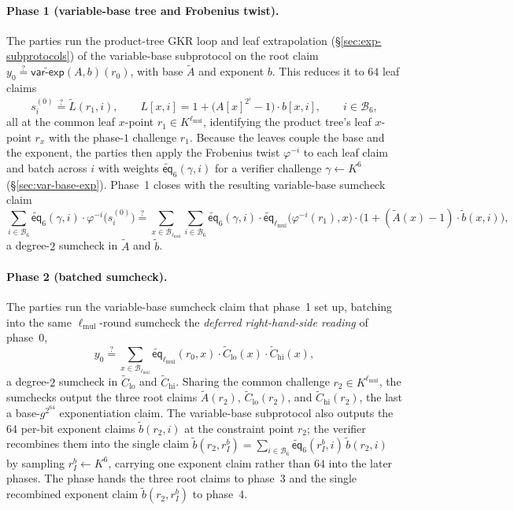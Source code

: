 \documentclass{article}
\theoremstyle{definition}
\newcommand*{\mle}{\widetilde}
\newcommand{\eq}{\mathsf{eq}}
\newcommand{\BB}{\mathcal{B}}
\begin{document}
\paragraph{Phase 1 (variable-base tree and Frobenius twist).}
The parties run the product-tree GKR loop and leaf extrapolation (\S\ref{sec:exp-subprotocols}) of the variable-base subprotocol on the root claim $y_0 \stackrel{?}{=} \mle{\textsf{var-exp}}(A, b)(r_0)$, with base $\mle{A}$ and exponent $b$. This reduces it to $64$ leaf claims
\[
  s^{(0)}_i \stackrel{?}{=} \mle{L}(r_1, i), \qquad L[x, i] = 1 + \bigl( A[x]^{2^i} - 1 \bigr) \cdot b[x, i], \qquad i \in \BB_6,
\]
all at the common leaf $x$-point $r_1 \in K^{\ell_\text{mul}}$, identifying the product tree's leaf $x$-point $r_x$ with the phase-$1$ challenge $r_1$. Because the leaves couple the base and the exponent, the parties then apply the Frobenius twist $\varphi^{-i}$ to each leaf claim and batch across $i$ with weights $\mle{\eq}_6(\gamma, i)$ for a verifier challenge $\gamma \gets K^6$ (\S\ref{sec:var-base-exp}). Phase~1 closes with the resulting variable-base sumcheck claim
\[
  \sum_{i \in \BB_6} \mle{\eq}_6(\gamma, i) \cdot \varphi^{-i}\bigl( s^{(0)}_i \bigr) \stackrel{?}{=} \sum_{x \in \BB_{\ell_\text{mul}}} \sum_{i \in \BB_6} \mle{\eq}_6(\gamma, i) \cdot \mle{\eq}_{\ell_\text{mul}}\bigl( \varphi^{-i}(r_1), x \bigr) \cdot \bigl( 1 + (\mle{A}(x) - 1) \cdot \mle{b}(x, i) \bigr),
\]
a degree-$2$ sumcheck in $\mle{A}$ and $\mle{b}$.

\paragraph{Phase 2 (batched sumcheck).}
The parties run the variable-base sumcheck claim that phase~1 set up, batching into the same $\ell_\text{mul}$-round sumcheck the \emph{deferred right-hand-side reading} of phase~0,
\[
  y_0 \stackrel{?}{=} \sum_{x \in \BB_{\ell_\text{mul}}} \mle{\eq}_{\ell_\text{mul}}(r_0, x) \cdot \mle{C}_\text{lo}(x) \cdot \mle{C}_\text{hi}(x),
\]
a degree-$2$ sumcheck in $\mle{C}_\text{lo}$ and $\mle{C}_\text{hi}$. Sharing the common challenge $r_2 \in K^{\ell_\text{mul}}$, the sumchecks output the three root claims $\mle{A}(r_2)$, $\mle{C}_\text{lo}(r_2)$, and $\mle{C}_\text{hi}(r_2)$, the last a base-$g^{2^{64}}$ exponentiation claim. The variable-base subprotocol also outputs the $64$ per-bit exponent claims $\mle{b}(r_2, i)$ at the constraint point $r_2$; the verifier recombines them into the single claim $\mle{b}(r_2, r_I^b) = \sum_{i \in \BB_6} \mle{\eq}_6(r_I^b, i) \, \mle{b}(r_2, i)$ by sampling $r_I^b \gets K^6$, carrying one exponent claim rather than $64$ into the later phases. The phase hands the three root claims to phase~3 and the single recombined exponent claim $\mle{b}(r_2, r_I^b)$ to phase~4.
\end{document}
